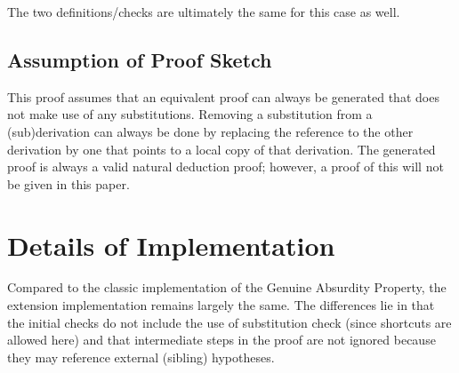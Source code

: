 \documentclass[11pt,twoside,a4paper]{report}
\begin{document}
The two definitions/checks are ultimately the same for this case as well.


\subsection{Assumption of Proof Sketch}
This proof assumes that an equivalent proof can always be generated that does not make use of any substitutions. Removing a substitution from a (sub)derivation can always be done by replacing the reference to the other derivation by one that points to a local copy of that derivation. The generated proof is always a valid natural deduction proof; however, a proof of this will not be given in this paper.

\section{Details of Implementation}
Compared to the classic implementation of the Genuine Absurdity Property, the extension implementation remains largely the same. The differences lie in that the initial checks do not include the use of substitution check (since shortcuts are allowed here) and that intermediate steps in the proof are not ignored because they may reference external (sibling) hypotheses.
\end{document}
